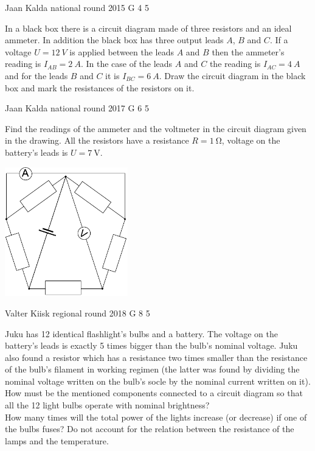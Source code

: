 \documentclass[11pt]{article}
\begin{document}
{Jaan Kalda} %
{national round} %
{2015} %
{G 4} %
{5} %
{

\ifEngStatement
In a black box there is a circuit diagram made of three resistors and an ideal ammeter. In addition the black box has three output leads $A$, $B$ and $C$. If a voltage $U=\SI{12}{V}$ is applied between the leads $A$ and $B$ then the ammeter’s reading is $I_{AB}=\SI{2}{A}$. In the case of the leads $A$ and $C$ the reading is $I_{AC}=\SI{4}{A}$ and for the leads $B$ and $C$ it is $I_{BC}=\SI{6}{A}$. Draw the circuit diagram in the black box and mark the resistances of the resistors on it.
\fi
}

{Jaan Kalda} %
{national round} %
{2017} %
{G 6} %
{5} %
{

\ifEngStatement
Find the readings of the ammeter and the voltmeter in the circuit diagram given in the drawing. All the resistors have a resistance $R=\SI{1}{\ohm}$, voltage on the battery’s leads is $U=\SI{7}{\volt}$. 
\begin{center}
	\includegraphics[width=0.4\textwidth]{2017-v3g-06-viisnurk}
\end{center}
\fi
}

{Valter Kiisk} %
{regional round} %
{2018} %
{G 8} %
{5} %
{

\ifEngStatement
Juku has 12 identical flashlight’s bulbs and a battery. The voltage on the battery’s leads is exactly 5 times bigger than the bulb’s nominal voltage. Juku also found a resistor which has a resistance two times smaller than the resistance of the bulb’s filament in working regimen (the latter was found by dividing the nominal voltage written on the bulb’s socle by the nominal current written on it).\\
\osa How must be the mentioned components connected to a circuit diagram so that all the 12 light bulbs operate with nominal brightness?\\
\osa How many times will the total power of the lights increase (or decrease) if one of the bulbs fuses? Do not account for the relation between the resistance of the lamps and the temperature.
\fi
}
\end{document}
